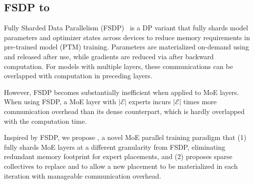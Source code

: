 \subsection{FSDP to \yyy}\label{sec:bg:fsdp}


Fully Sharded Data Parallelism (FSDP)~\cite{rajbhandari2020zero,zhao2023pytorchfsdp} is a DP variant that fully shards model parameters and optimizer states across devices to reduce memory requirements in pre-trained model (PTM) training.
Parameters are materialized on-demand using \collag and released after use, while gradients are reduced via \collrs after backward computation.
For models with multiple layers, these communications can be overlapped with computation in preceding layers.

However, FSDP becomes substantially inefficient when applied to MoE layers.
When using FSDP, a MoE layer with $|\mathcal{E}|$ experts incurs $|\mathcal{E}|$ times more communication overhead than its dense counterpart, which is hardly overlapped with the computation time.

Inspired by FSDP, we propose \yyy, a novel MoE parallel training paradigm that (1) fully shards MoE layers at a different granularity from FSDP, eliminating redundant memory footprint for expert placements, and (2) proposes sparse collectives to replace \collag and \collrs to allow a new placement to be materialized in each iteration with manageable communication overhead.





